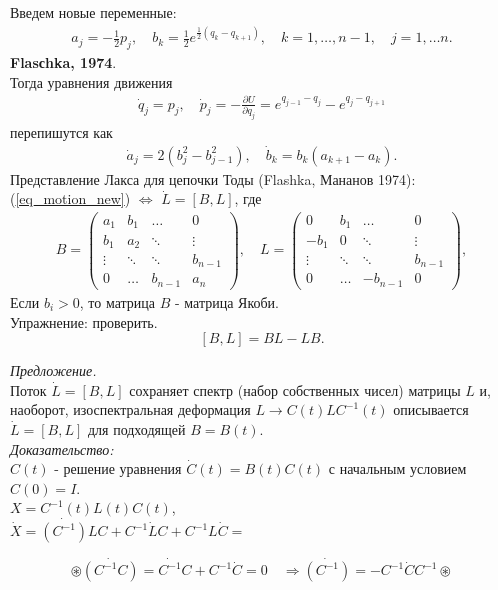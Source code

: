 \documentclass[a4paper,12pt]{article}
\theoremstyle{definition}
\theoremstyle{definition}
\theoremstyle{definition}
\newcommand{\bear}[1]{\begin{eqnarray}\label{#1}}
\newcommand{\ear}{\end{eqnarray}}
\begin{document}
Введем новые переменные:
\bear{Flaschka_var}
a_{j} = -\frac12 p_{j},\quad b_{k} = \frac12 e^{\frac 12 (q_{k} - q_{k+1})}, \quad k = 1,\ldots,n-1,\quad j = 1,\ldots n.
\ear \textbf{Flasсhka, 1974}.\\
Тогда уравнения движения
\bear{eq_motion}
\dot{q}_{j} =  p_{j}, \quad \dot{p}_{j} = -\frac{\partial U}{\partial q_{j}} = e^{q_{j-1} - q_{j}} - e^{q_{j} - q_{j+1}}
\ear
перепишутся как
\bear{eq_motion_new}
\dot{a}_{j} = 2(b^{2}_{j} - b^{2}_{j-1}), \quad \dot{b}_{k} = b_{k}(a_{k+1} - a_{k}).
\ear
Представление Лакса для цепочки Тоды (Flashka, Мананов 1974):\\
(\ref{eq_motion_new}) $\Longleftrightarrow$ $\dot{L} = [B, L]$, где
\bear{matrices}
B =
\left( \begin{array}{cccc}
a_{1}& b_{1} &\ldots & 0\\
b_{1}& a_{2} &\ddots & \vdots\\
\vdots & \ddots &\ddots & b_{n-1}\\
0& \ldots & b_{n-1}  & a_{n}
\end{array}
\right), \quad
L =
\left( \begin{array}{cccc}
0 & b_{1} &\ldots & 0\\
- b_{1} & 0 &\ddots & \vdots\\
\vdots & \ddots &\ddots & b_{n-1}\\
0 & \ldots & -b_{n-1}  & 0
\end{array}
\right),
\ear
Если $b_{i}>0 $, то матрица $B$ - матрица Якоби.\\
Упражнение: проверить.
\[[B,L] = BL - LB.\]

\textit{Предложение.}\\

Поток $\dot{L} = [B,L]$ сохраняет спектр  (набор собственных чисел) матрицы $L$
и, наоборот, изоспектральная деформация $L \rightarrow C(t)LC^{-1}(t)$ описывается $\dot{L} = [B,L]$ для подходящей $B = B(t)$.\\

\textit{Доказательство:}\\
$C(t)$ - решение уравнения $\dot{C}(t) =  B(t)C(t)$  с начальным условием $C(0) = I$.\\
$X = C^{-1}(t)L(t)C(t)$,\\
$\dot{X} = \dot{(C^{-1})}LC + C^{-1}\dot{L}C + C^{-1}L\dot{C} = $

\[\circledast \dot{\left(C^{-1}C\right)} = \dot{C^{-1}}C + C^{-1}\dot{C} = 0 \quad  \Rightarrow \dot{\left(C^{-1}\right)}  = -C^{-1}\dot{C}C^{-1} \circledast\]
\end{document}
